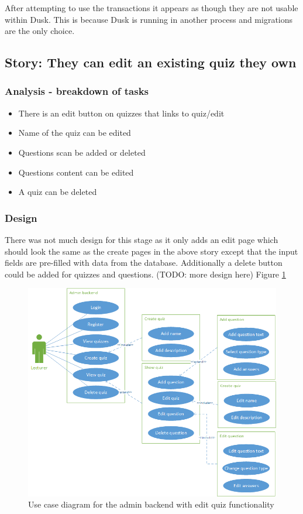 After attempting to use the transactions it appears as though they are not usable within Dusk. This is because Dusk is running in another process and migrations are the only choice\cite{dusk-transactions}. 
\newpage

\subsection{Story: They can edit an existing quiz they own}
\subsubsection{Analysis - breakdown of tasks}
\begin{itemize}
	\item There is an edit button on quizzes that links to quiz/edit
	\item Name of the quiz can be edited
	\item Questions scan be added or deleted
	\item Questions content can be edited
	\item A quiz can be deleted
\end{itemize}
\subsubsection{Design}
There was not much design for this stage as it only adds an edit page which should look the same as the create pages in the above story except that the input fields are pre-filled with data from the database. Additionally a delete button could be added for quizzes and questions. (TODO: more design here) Figure \ref{fig:quiz-edit-use-case}
\begin{figure}
	\caption{Use case diagram for the admin backend with edit quiz functionality}
	\centerline{\includegraphics{Chapter2/Iter-2/iter-2-use-case-edit}}
	\label{fig:quiz-edit-use-case}
\end{figure}
